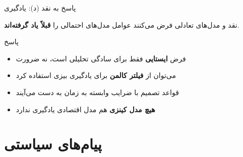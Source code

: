 \documentclass[aspectratio=169,11pt]{beamer}
\newcommand{\highlight}[1]{\textcolor{AccentOrange}{\textbf{#1}}}
\newcommand{\important}[1]{\textcolor{AlertRed}{\textbf{#1}}}
\newcommand{\keyword}[1]{\textcolor{MainBlue}{\textbf{#1}}}
\begin{document}
\begin{frame}{پاسخ به نقد (د): یادگیری}
	\begin{alertblock}{نقد  و }
		\centering
		مدل‌های تعادلی فرض می‌کنند عوامل مدل‌های احتمالی را \important{قبلاً یاد گرفته‌اند}.
	\end{alertblock}
	\vspace{0.3cm}
	\begin{exampleblock}{پاسخ}
		\begin{itemize}
			\item فرض \highlight{ایستایی} فقط برای سادگی تحلیلی است، نه ضرورت
			\item می‌توان از \keyword{فیلتر کالمن} برای یادگیری بیزی استفاده کرد
			\item قواعد تصمیم با ضرایب وابسته به زمان به دست می‌آیند
			\item \important{هیچ مدل کینزی} هم مدل اقتصادی یادگیری ندارد
		\end{itemize}
	\end{exampleblock}
\end{frame}

\section{پیام‌های سیاستی}
\end{document}
